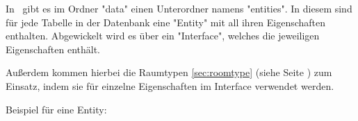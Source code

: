 
In \ZELIA\ gibt es im Ordner "data" einen Unterordner namens "entities". In diesem sind für jede Tabelle in der Datenbank eine "Entity" mit all ihren Eigenschaften enthalten. Abgewickelt wird es über ein "Interface", welches die jeweiligen Eigenschaften enthält.

Außerdem kommen hierbei die Raumtypen \ref{sec:roomtype} (siehe Seite \pageref{sec:roomtype}) zum Einsatz, indem sie für einzelne Eigenschaften im Interface verwendet werden.

Beispiel für eine Entity:

